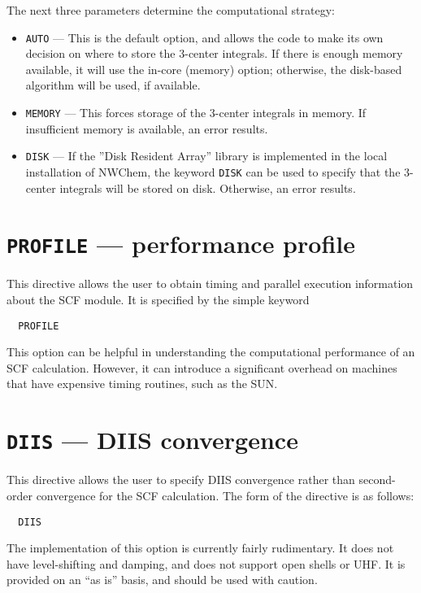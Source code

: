 The next three parameters determine the computational strategy:
\begin{itemize}
\item \verb+AUTO+ --- This is the default option, and allows the code
  to make its own decision on where to store the 3-center integrals.
  If there is enough memory available, it will use the in-core (memory) option;
  otherwise, the disk-based algorithm will be used, if available.

\item \verb+MEMORY+ --- This forces storage of the 3-center integrals
  in memory.  If insufficient memory is available, an error results.

\item \verb+DISK+ --- If the ''Disk Resident Array'' library is
  implemented in the local installation of NWChem, the keyword
  \verb+DISK+ can be used to specify that the 3-center integrals will
  be stored on disk.  Otherwise, an error results.
\end{itemize}

\section{{\tt PROFILE} --- performance profile}

This directive allows the user to obtain timing and parallel
execution information about the SCF module.  It is specified by the
simple keyword

\begin{verbatim}
  PROFILE
\end{verbatim}

This option can be helpful in understanding the computational
performance of an SCF calculation.  However,
it can introduce a significant overhead 
on machines that have expensive timing routines, such as the SUN.

\section{{\tt DIIS} --- DIIS convergence}

This directive allows the user to specify DIIS convergence rather than
second-order convergence for the SCF calculation.  The form of the
directive is as follows:

\begin{verbatim}
  DIIS
\end{verbatim}

The implementation of this option is currently fairly rudimentary.  It
does not have level-shifting and damping, and does not support open
shells or UHF.  It is provided on an ``as is'' basis, and should be
used with caution.

